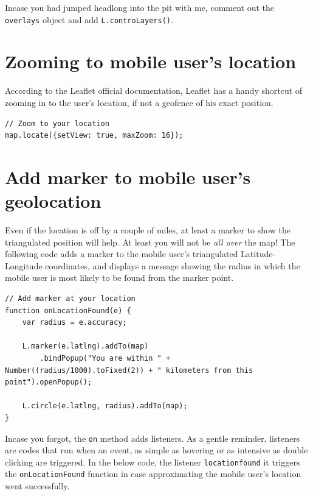 \documentclass[
]{book}
\begin{document}
Incase you had jumped headlong into the pit with me, comment out the \texttt{overlays} object and add \texttt{L.controLayers()}.

\hypertarget{zooming-to-mobile-users-location}{%
\section{Zooming to mobile user's location}\label{zooming-to-mobile-users-location}}

According to the Leaflet official documentation, Leaflet has a handy shortcut of zooming in to the user's location, if not a geofence of his exact position.

\begin{verbatim}
// Zoom to your location
map.locate({setView: true, maxZoom: 16});
\end{verbatim}

\hypertarget{add-marker-to-mobile-users-geolocation}{%
\section{Add marker to mobile user's geolocation}\label{add-marker-to-mobile-users-geolocation}}

Even if the location is off by a couple of miles, at least a marker to show the triangulated position will help. At least you will not be \emph{all over} the map! The following code adds a marker to the mobile user's triangulated Latitude-Longitude coordinates, and displays a message showing the radius in which the mobile user is most likely to be found from the marker point.

\begin{verbatim}
// Add marker at your location
function onLocationFound(e) {
    var radius = e.accuracy;

    L.marker(e.latlng).addTo(map)
        .bindPopup("You are within " + Number((radius/1000).toFixed(2)) + " kilometers from this point").openPopup();

    L.circle(e.latlng, radius).addTo(map);
}
\end{verbatim}

Incase you forgot, the \texttt{on} method adds listeners. As a gentle reminder, listeners are codes that run when an event, as simple as hovering or as intensive as double clicking are triggered. In the below code, the listener \texttt{\textquotesingle{}locationfound\textquotesingle{}} it triggers the \texttt{onLocationFound} function in case approximating the mobile user's location went successfully.
\end{document}
